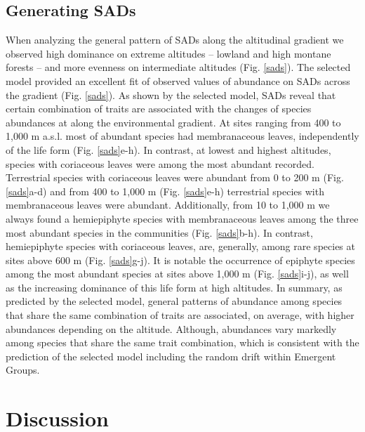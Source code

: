 \documentclass[12pt]{article}
\begin{document}
\subsection*{Generating SADs}

When analyzing the general pattern of SADs along the altitudinal
gradient we observed high dominance on extreme altitudes -- 
lowland and high montane forests -- and more  
evenness on intermediate
altitudes (Fig. \ref{sads}).
The selected model provided an excellent fit of observed
values of abundance on SADs across the gradient (Fig. \ref{sads}).
As shown by the selected  
model, SADs reveal that certain combination of traits are associated with
the changes of species abundances at along the environmental gradient.  
At sites ranging from 400 to 1,000 m a.s.l. most of abundant species
had membranaceous leaves, 
independently of the life form
(Fig. \ref{sads}e-h). In contrast, at lowest and highest
altitudes, species with coriaceous leaves were among the most
abundant recorded. 
Terrestrial species with coriaceous leaves were abundant from
0 to 200 m (Fig. \ref{sads}a-d) and from 400 to 1,000 m (Fig.
\ref{sads}e-h) terrestrial species with membranaceous leaves were
abundant. Additionally, from 10 to 1,000 m we always found a
hemiepiphyte species with membranaceous leaves among the three most
abundant species in the communities (Fig. \ref{sads}b-h). In
contrast, hemiepiphyte species with coriaceous leaves, are, generally,
among rare species at sites above 600 m (Fig. \ref{sads}g-j). It is
notable the occurrence of epiphyte species among the most
abundant species at sites above  1,000 m (Fig. \ref{sads}i-j), as well as the increasing
dominance of this life form at high altitudes.  
In summary, as predicted by the selected model, general patterns of
abundance among species that share the same combination of traits 
are associated, on average, with higher abundances depending on the
altitude. Although, abundances vary markedly among species that share
the same trait combination, which is consistent
with the prediction of the selected model including the random drift
within Emergent Groups.

\section*{Discussion}
\end{document}
